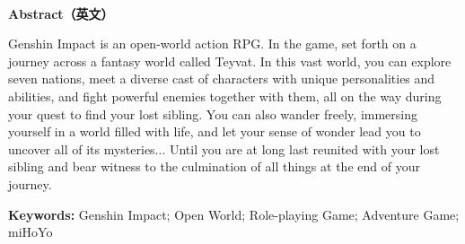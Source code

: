 \cleardoublepage

\begin{center}
    ~\\[-1.5em]
    \textbf{Abstract（英文）}
\end{center}

\par Genshin Impact is an open-world action RPG. In the game, set forth on a journey across a fantasy world 
called Teyvat. In this vast world, you can explore seven nations, meet a diverse cast of characters with 
unique personalities and abilities, and fight powerful enemies together with them, all on the way during 
your quest to find your lost sibling. You can also wander freely, immersing yourself in a world filled with 
life, and let your sense of wonder lead you to uncover all of its mysteries... Until you are at long last 
reunited with your lost sibling and bear witness to the culmination of all things at the end of your journey.

\bigskip

\noindent \textbf{Keywords:} Genshin Impact; Open World; Role-playing Game; Adventure Game; miHoYo
